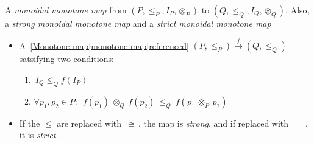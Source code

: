 
A \emph{monoidal monotone map} from $(P,\leq_P,I_P,\otimes_P)$ to $(Q, \leq_Q,I_Q,\otimes_Q)$. Also, a \emph{strong monoidal monotone map} and a \emph{strict monoidal monotone map}

\begin{itemize}
    \item A \,\ref{Monotone map|monotone map|referenced} $(P,\leq_P) \xrightarrow{f} (Q,\leq_Q)$\, satsifying two conditions:
          \begin{enumerate}
            \item \,$I_Q \leq_Q f(I_P)$\,
            \item $\forall p_1,p_2 \in P:$ \,$f(p_1)\ \otimes_Q\ f(p_2)\ \leq_Q\ f(p_1\ \otimes_P\ p_2)$\,
          \end{enumerate}
    \item If the $\leq$ are replaced with \,$\cong$\,, the map is \emph{strong}, and if replaced with \,$=$\,, it is \emph{strict}.
  \end{itemize}

